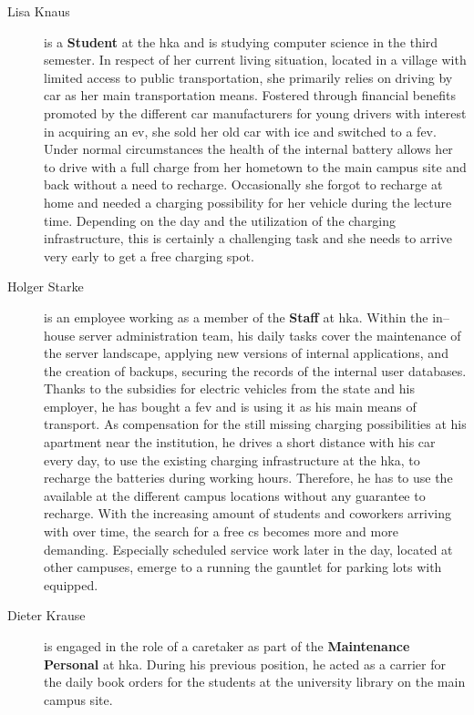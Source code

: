 \begin{description}
    \item[Lisa Knaus] is a \textbf{Student} at the \acrshort{hka} and is studying computer science in the third semester. In respect of her current living situation, located in a village with limited access to public transportation, she primarily relies on driving by car as her main transportation means. 
    Fostered through financial benefits promoted by the different car manufacturers for young drivers with interest in acquiring an \acrshort{ev}, she sold her old car with \acrshort{ice} and switched to a \acrfull{fev}. 
    Under normal circumstances the health of the internal battery allows her to drive with a full charge from her hometown to the main campus site and back without a need to recharge. Occasionally she forgot to recharge at home and needed a charging possibility for her vehicle during the lecture time. Depending on the day and the utilization of the charging infrastructure, this is certainly a challenging task and she needs to arrive very early to get a free charging spot. 
    \item[Holger Starke] is an employee working as a member of the \textbf{Staff} at \acrshort{hka}. 
    Within the in--house server administration team, his daily tasks cover the maintenance of the server landscape, applying new versions of internal applications, and the creation of backups, securing the records of the internal user databases. 
    Thanks to the subsidies for electric vehicles from the state and his employer, he has bought a \acrshort{fev} and is using it as his main means of transport. 
    As compensation for the still missing charging possibilities at his apartment near the institution, he drives a short distance with his car every day, to use the existing charging infrastructure at the \acrshort{hka}, to recharge the batteries during working hours. 
    Therefore, he has to use the available  at the different campus locations without any guarantee to recharge. 
    With the increasing amount of students and coworkers arriving with  over time, the search for a free \acrshort{cs} becomes more and more demanding. 
    Especially scheduled service work later in the day, located at other campuses, emerge to a running the gauntlet for parking lots with  equipped. 
    \item[Dieter Krause] is engaged in the role of a caretaker as part of the \textbf{Maintenance Personal} at \acrshort{hka}. During his previous position, he acted as a carrier for the daily book orders for the students at the university library on the main campus site. 

\end{description}
